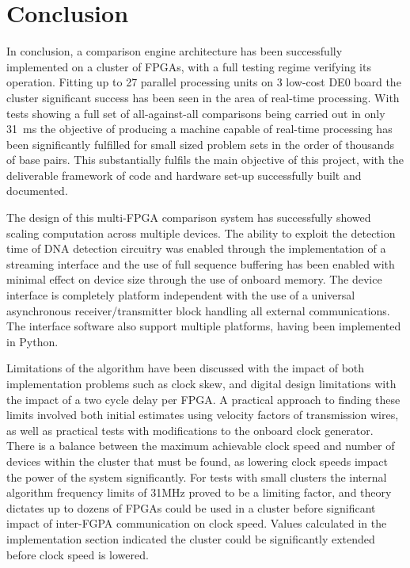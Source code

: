 \chapter{Conclusion}
\renewcommand{\baselinestretch}{\mystretch}
\label{chap:conclusion}
In conclusion, a comparison engine architecture has been successfully implemented on a cluster of FPGAs, with a full testing regime verifying its operation. Fitting up to 27 parallel processing units on 3 low-cost DE0 board the cluster significant success has been seen in the area of real-time processing. With tests showing a full set of all-against-all comparisons being carried out in only 31~ms the objective of producing a machine capable of real-time processing has been significantly fulfilled for small sized problem sets in the order of thousands of base pairs. This substantially fulfils the main objective of this project, with the deliverable framework of code and hardware set-up successfully built and documented.


The design of this multi-FPGA comparison system has successfully showed scaling computation across multiple devices. The ability to exploit the detection time of DNA detection circuitry was enabled through the implementation of a streaming interface and the use of full sequence buffering has been enabled with minimal effect on device size through the use of onboard memory. The device interface is completely platform independent with the use of a universal asynchronous receiver/transmitter block handling all external communications. The interface software also support multiple platforms, having been implemented in Python.

Limitations of the algorithm have been discussed with the impact of both implementation problems such as clock skew, and digital design limitations with the impact of a two cycle delay per FPGA. A practical approach to finding these limits involved both initial estimates using velocity factors of transmission wires, as well as practical tests with modifications to the onboard clock generator. There is a balance between the maximum achievable clock speed and number of devices within the cluster that must be found, as lowering clock speeds impact the power of the system significantly. For tests with small clusters the internal algorithm frequency limits of 31MHz proved to be a limiting factor, and theory dictates up to dozens of FPGAs could be used in a cluster before significant impact of inter-FGPA communication on clock speed. Values calculated in the implementation section indicated the cluster could be significantly extended before clock speed is lowered.


